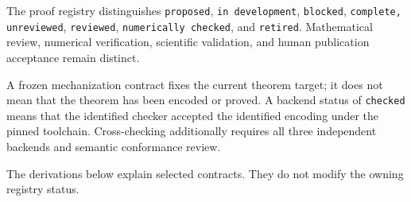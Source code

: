 The proof registry distinguishes \texttt{proposed}, \texttt{in development},
\texttt{blocked}, \texttt{complete, unreviewed}, \texttt{reviewed},
\texttt{numerically checked}, and \texttt{retired}. Mathematical review,
numerical verification, scientific validation, and human publication acceptance
remain distinct.

A frozen mechanization contract fixes the current theorem target; it does not
mean that the theorem has been encoded or proved. A backend status of
\texttt{checked} means that the identified checker accepted the identified
encoding under the pinned toolchain. Cross-checking additionally requires all
three independent backends and semantic conformance review.

The derivations below explain selected contracts. They do not modify the owning
registry status.
